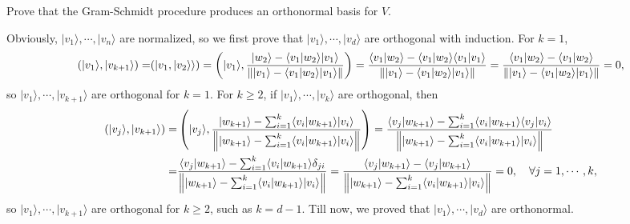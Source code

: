 \documentclass[en]{sol-man}
\begin{document}
\begin{exe}
    Prove that the Gram-Schmidt procedure produces an orthonormal basis for $V$.
\end{exe}
\begin{pf}
    Obviously, $\lvert v_1\rangle,\cdots,\lvert v_n\rangle$ are normalized, so we first prove that $\lvert v_1\rangle,\cdots,\lvert v_d\rangle$ are orthogonal with induction.
    For $k=1$,
    \begin{align}
        (\lvert v_1\rangle,\lvert v_{k+1}\rangle)=&(\lvert v_1,\lvert v_2\rangle\rangle)=\left(\lvert v_1\rangle,\frac{\lvert w_2\rangle-\langle v_1\vert w_2\rangle\lvert v_1\rangle}{\left\lVert\lvert v_1\rangle-\langle v_1\vert w_2\rangle\lvert v_1\rangle\right\rVert}\right)=\frac{\langle v_1\vert w_2\rangle-\langle v_1\vert w_2\rangle\langle v_1\vert v_1\rangle}{\left\lVert\lvert v_1\rangle-\langle v_1\vert w_2\rangle\lvert v_1\rangle\right\rVert}=\frac{\langle v_1\vert w_2\rangle-\langle v_1\vert w_2\rangle}{\left\lVert\lvert v_1\rangle-\langle v_1\vert w_2\rangle\lvert v_1\rangle\right\rVert}=0,\\
    \end{align}
    so $\lvert v_1\rangle,\cdots,\lvert v_{k+1}\rangle$ are orthogonal for $k=1$.
    For $k\geq 2$, if $\lvert v_1\rangle,\cdots,\lvert v_k\rangle$ are orthogonal, then
    \begin{align}
        \notag(\lvert v_j\rangle,\lvert v_{k+1}\rangle)=&\left(\lvert v_j\rangle,\frac{\lvert w_{k+1}\rangle-\sum_{i=1}^k\langle v_i\vert w_{k+1}\rangle\lvert v_i\rangle}{\left\lVert\lvert w_{k+1}\rangle-\sum_{i=1}^k\langle v_i\vert w_{k+1}\rangle\lvert v_i\rangle\right\rVert}\right)=\frac{\langle v_j\vert w_{k+1}\rangle-\sum_{i=1}^k\langle v_i\vert w_{k+1}\rangle\langle v_j\vert v_i\rangle}{\left\lVert\lvert w_{k+1}\rangle-\sum_{i=1}^k\langle v_i\vert w_{k+1}\rangle\lvert v_i\rangle\right\rVert}\\
        =&\frac{\langle v_j\vert w_{k+1}\rangle-\sum_{i=1}^k\langle v_i\vert w_{k+1}\rangle\delta_{ji}}{\left\lVert\lvert w_{k+1}\rangle-\sum_{i=1}^k\langle v_i\vert w_{k+1}\rangle\lvert v_i\rangle\right\rVert}=\frac{\langle v_j\vert w_{k+1}\rangle-\langle v_j\vert w_{k+1}\rangle}{\left\lVert\lvert w_{k+1}\rangle-\sum_{i=1}^k\langle v_i\vert w_{k+1}\rangle\lvert v_i\rangle\right\rVert}=0,\quad\forall j=1,\cdots,k,
    \end{align}
    so $\lvert v_1\rangle,\cdots,\lvert v_{k+1}\rangle$ are orthogonal for $k\geq 2$, such as $k=d-1$.
    Till now, we proved that $\lvert v_1\rangle,\cdots,\lvert v_d\rangle$ are orthonormal.


\end{pf}
\end{document}
